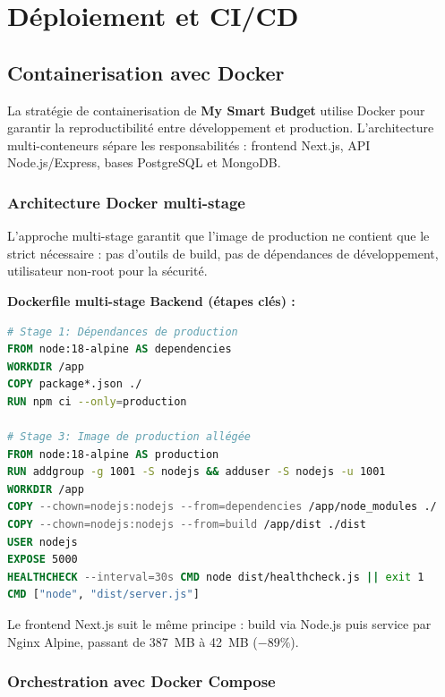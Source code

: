 \chapter{Déploiement et CI/CD}

\section{Containerisation avec Docker}

La stratégie de containerisation de \textbf{My Smart Budget} utilise Docker pour garantir la reproductibilité entre développement et production. L'architecture multi-conteneurs sépare les responsabilités : frontend Next.js, API Node.js/Express, bases PostgreSQL et MongoDB.

\subsection{Architecture Docker multi-stage}

L'approche multi-stage garantit que l'image de production ne contient que le strict nécessaire : pas d'outils de build, pas de dépendances de développement, utilisateur non-root pour la sécurité.

\begin{exemple}
\textbf{Dockerfile multi-stage Backend (étapes clés) :}
\begin{lstlisting}[language=dockerfile]
# Stage 1: Dépendances de production
FROM node:18-alpine AS dependencies
WORKDIR /app
COPY package*.json ./
RUN npm ci --only=production

# Stage 3: Image de production allégée
FROM node:18-alpine AS production
RUN addgroup -g 1001 -S nodejs && adduser -S nodejs -u 1001
WORKDIR /app
COPY --chown=nodejs:nodejs --from=dependencies /app/node_modules ./
COPY --chown=nodejs:nodejs --from=build /app/dist ./dist
USER nodejs
EXPOSE 5000
HEALTHCHECK --interval=30s CMD node dist/healthcheck.js || exit 1
CMD ["node", "dist/server.js"]
\end{lstlisting}
\end{exemple}

Le frontend Next.js suit le même principe : build via Node.js puis service par Nginx Alpine, passant de 387~MB à 42~MB (\(-89\%\)).

\subsection{Orchestration avec Docker Compose}

